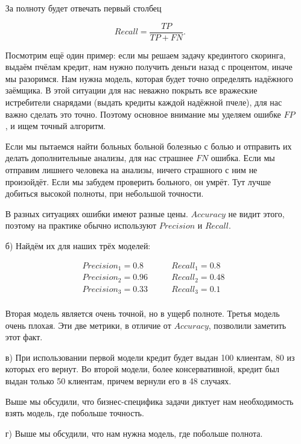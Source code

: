 \documentclass[12pt, a4paper, oneside]{article}
\theoremstyle{plain} %
\theoremstyle{definition}
\begin{document}
\begin{solution}
\begin{enumerate}
		За полноту будет отвечать первый столбец
		
		\[Recall = \frac{TP}{TP + FN}.\]
		
		Посмотрим ещё один пример: если мы решаем задачу крединтого скоринга, выдаём пчёлам кредит, нам нужно получить деньги назад с процентом, иначе мы разоримся. Нам нужна модель, которая будет точно определять надёжного заёмщика. В этой ситуации для нас неважно покрыть все вражеские истребители снарядами (выдать кредиты каждой надёжной пчеле), для нас важно сделать это точно. Поэтому основное внимание мы уделяем ошибке $FP$, и ищем точный алгоритм. 
		
		Если мы пытаемся найти больных больной болезнью с болью и отправить их делать дополнительные анализы, для нас страшнее $FN$ ошибка. Если мы отправим лишнего человека на анализы, ничего страшного с ним не произойдёт. Если мы забудем проверить больного, он умрёт. Тут лучше добиться высокой полноты, при небольшой точности. 
		
		В разных ситуациях ошибки имеют разные цены. $Accuracy$ не видит этого, поэтому на практике обычно используют $Precision$ и $Recall$. 
		
		\item[б)]  Найдём их для наших трёх моделей: 
		
		\begin{equation} 
		\begin{aligned}
		&Precision_1 =  0.8   \qquad &Recall_1 = 0.8 \\ 
		&Precision_2 = 0.96  \qquad &Recall_2 = 0.48 \\ 
		&Precision_3 = 0.33  \qquad &Recall_3 = 0.1  \\
		\end{aligned}
		\end{equation} 
		
		Вторая модель является очень точной, но в ущерб полноте. Третья модель очень плохая. Эти две метрики, в отличие от $Accuracy$, позволили заметить этот факт. 
		
		\item[в)] При использовании первой модели кредит будет выдан 100 клиентам, 80 из которых его вернут. Во второй модели, более консервативной, кредит был выдан только 50 клиентам, причем вернули его в 48 случаях. 
		
		Выше мы обсудили, что бизнес-специфика задачи диктует нам необходимость взять модель, где побольше точность.
		
		\item[г)]  Выше мы обсудили, что нам нужна модель, где побольше полнота.
		

\end{enumerate}
\end{solution}
\end{document}
